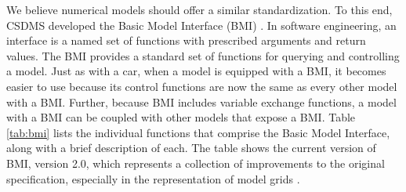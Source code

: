 \documentclass[12pt]{amsart}
\begin{document}
We believe %
numerical models should offer a similar standardization.
To this end, CSDMS
developed the Basic Model Interface (BMI) \citep{peckham2013component,hutton2020bmi}.
In software engineering,
an interface is a named set of functions
with prescribed arguments and return values.
The BMI provides a standard set of functions
for querying and controlling a model.
Just as with a car,
when a model is equipped with a BMI,
it becomes easier to use
because its control functions are now the same as every other model with a BMI.
Further, because BMI includes variable exchange functions,
a model with a BMI can be coupled with other models that expose a BMI.
Table \ref{tab:bmi} lists the individual functions
that comprise the Basic Model Interface,
along with a brief description of each.
The table shows the current version of BMI, version 2.0,
which represents a collection of improvements to the original specification,
especially in the representation of model grids \citep{hutton2020bmi}.
\end{document}
